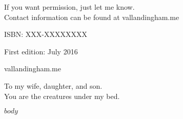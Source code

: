 \documentclass[12pt]{book}
\newcommand\blankpage{%
    \null
    \thispagestyle{empty}%
    \addtocounter{page}{-1}%
    \newpage}
\begin{document}
  If you want permission, just let me know.\\
  Contact information can be found at vallandingham.me


  ISBN: XXX-XXXXXXXX

  First edition: July 2016

  \vfill
  vallandingham.me
  \vspace*{2\baselineskip}
  \clearpage
  \endgroup

  \begingroup
  \vspace*{\fill}
  \begin{center}
  To my wife, daughter, and son.\\
  You are the creatures under my bed.
  \end{center}
  \vspace*{\fill}
  \afterpage{\blankpage}
  \endgroup
  \setcounter{page}{0}
  \clearpage



  \pagestyle{fancy}

  $body$
\end{document}

